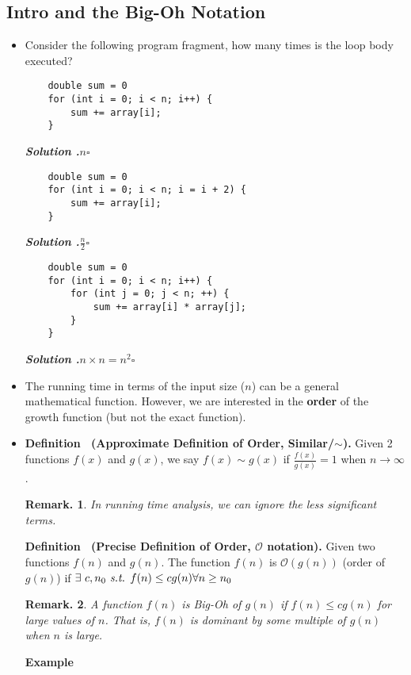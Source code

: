 \documentclass[12pt, a4paper]{article}
\newcounter{index}
\newenvironment*{df}[1]{\par\noindent\textbf{Definition \stepcounter{index}\theindex\ (#1).}}{\par}
\newenvironment*{eg}{\par\begin{tcolorbox}\noindent\textbf{Example}\quad}{\end{tcolorbox}\par}
\newcounter{nprf}[subsection]
\newenvironment*{sol}{\par \indent\textbf{\textit{Solution \stepcounter{nprf}\thenprf.\quad}}}{\hfill{$\square$}\par}
\newtheorem*{rmk}{Remark.}
\def\O{\mathcal{O}}
\def\st{\emph{ s.t. }}
\begin{document}
\subsection*{Intro and the Big-Oh Notation}
\begin{itemize}
\item Consider the following program fragment, how many times is the loop body executed? 
\begin{lstlisting}
	double sum = 0
	for (int i = 0; i < n; i++) {
		sum += array[i];
	}
\end{lstlisting}
\begin{sol}$n$\end{sol}
\begin{lstlisting}
	double sum = 0
	for (int i = 0; i < n; i = i + 2) {
		sum += array[i];
	}
\end{lstlisting}
\begin{sol}$\frac{n}{2}$\end{sol}
\begin{lstlisting}
	double sum = 0
	for (int i = 0; i < n; i++) {
		for (int j = 0; j < n; ++) { 
			sum += array[i] * array[j]; 
		}
	}
\end{lstlisting}
\begin{sol}$n\times n=n^2$\end{sol}
\item The running time in terms of the input size ($n$) can be a general mathematical function. However, we are interested in the \textbf{order} of the growth function (but not the exact function). 
\item \begin{df}{Approximate Definition of Order, Similar/$\sim$}
 		Given 2 functions $f(x)$ and $g(x)$, we say $f(x)\sim g(x)$ if $\frac{f(x)}{g(x)}=1$ when $n\to\infty$. \end{df}
\begin{rmk}In running time analysis, we can ignore the less significant terms.\end{rmk}
\begin{df}{Precise Definition of Order, $\O$ notation}
Given two functions $f(n)$ and $g(n)$. The function $f(n)$ is $\O(g(n))$ (order of $g(n)$) if $\exists\ c,n_0\st f(n)\leq cg(n)\forall n\geq n_0$\end{df} \begin{rmk}A function $f(n)$ is Big-Oh of $g(n)$ if $f(n)\leq cg(n)$ for large values of $n$. That is, $f(n)$ is dominant by some multiple of $g(n)$ when $n$ is large. \end{rmk}
\begin{eg}

\end{eg}
\end{itemize}
\end{document}
